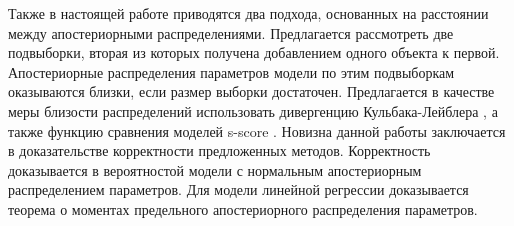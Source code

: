 Также в настоящей работе приводятся два подхода, основанных на расстоянии между апостериорными распределениями. Предлагается рассмотреть две подвыборки, вторая из которых получена добавлением одного объекта к первой. Апостериорные распределения параметров модели по этим подвыборкам оказываются близки, если размер выборки достаточен. Предлагается в качестве меры близости распределений использовать дивергенцию Кульбака-Лейблера \cite{MOTRENKO2014743}, а также функцию сравнения моделей s-score \cite{Aduenko2017}. Новизна данной работы заключается в доказательстве корректности предложенных методов. Корректность доказывается в вероятностой модели с нормальным апостериорным распределением параметров. Для модели линейной регрессии доказывается теорема о моментах предельного апостериорного распределения параметров.